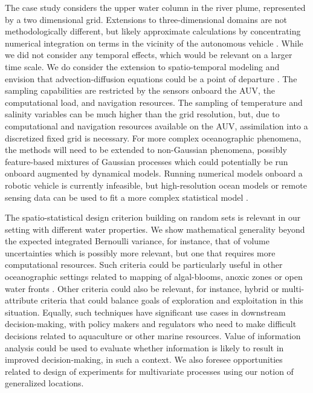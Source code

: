\documentclass[aoas,preprint]{imsart}
\begin{document}
The case study considers the upper water column in the river plume,
represented by a two dimensional grid. Extensions to three-dimensional
domains are not methodologically different, but likely approximate
calculations by concentrating numerical integration on terms in the
vicinity of the autonomous vehicle \citep{fossum18b}. While we did not
consider any temporal effects, which would be relevant on a larger
time scale. We do consider the extension to spatio-temporal modeling
and envision that advection-diffusion equations could be a point of departure
\citep{sigrist2015stochastic,richardson2017sparsity}. The sampling
capabilities are restricted by the sensors onboard the AUV, the
computational load, and navigation resources. The sampling of
temperature and salinity variables can be much higher than the grid
resolution, but, due to computational and navigation resources
available on the AUV, assimilation into a discretized fixed grid is
necessary. For more complex oceanographic phenomena, the methods will
need to be extended to non-Gaussian phenomena, possibly feature-based
mixtures of Gaussian processes which could potentially be run onboard
augmented by dynamical models. Running numerical models onboard a
robotic vehicle is currently infeasible, but high-resolution ocean
models or remote sensing data can be used to fit a more complex
statistical model \cite{davidson19}.

The spatio-statistical design criterion building on random sets is
relevant in our setting with different water properties.  We show
mathematical generality beyond the expected integrated Bernoulli
variance, for instance, that of volume uncertainties which is possibly
more relevant, but one that requires more computational resources.
Such criteria could be particularly useful in other oceanographic
settings related to mapping of algal-blooms, anoxic zones or open
water fronts \cite{costa19}.  Other criteria could also be relevant,
for instance, hybrid or multi-attribute criteria that could balance
goals of exploration and exploitation in this situation. Equally, such
techniques have significant use cases in downstream decision-making,
with policy makers and regulators who need to make difficult decisions
related to aquaculture or other marine resources. Value of information
analysis \citep{Eidsvik:15} could be used to evaluate whether
information is likely to result in improved decision-making, in such a
context.  We also foresee opportunities related to design of
experiments for multivariate processes using our notion of generalized
locations.
\end{document}
